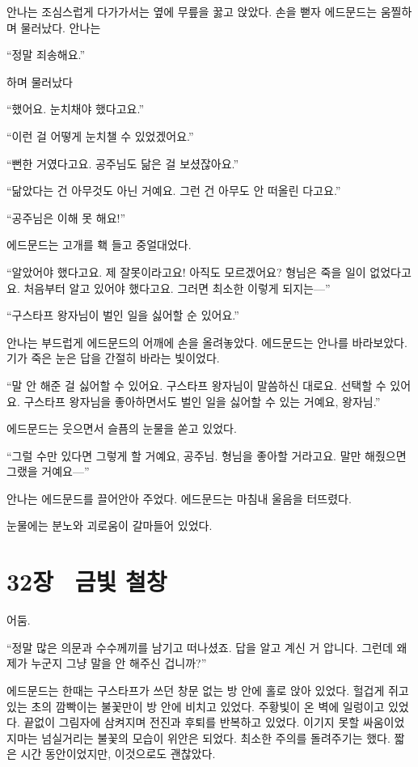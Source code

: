 안나는 조심스럽게 다가가서는 옆에 무릎을 꿇고 앉았다. 손을 뻗자 에드문드는 움찔하며 물러났다. 안나는

``정말 죄송해요.''

하며 물러났다

`` 했어요. 눈치채야 했다고요.''

``이런 걸 어떻게 눈치챌 수 있었겠어요.''

``뻔한 거였다고요. 공주님도 닮은 걸 보셨잖아요.''

``닮았다는 건 아무것도 아닌 거예요. 그런 건 아무도 안 떠올린 다고요.''

``공주님은 이해 못 해요!''

에드문드는 고개를 홱 들고 중얼대었다.

``알았어야 했다고요. 제 잘못이라고요! 아직도 모르겠어요? 형님은 죽을 일이 없었다고요. 처음부터 알고 있어야 했다고요. 그러면 최소한 이렇게 되지는—''

``구스타프 왕자님이 벌인 일을 싫어할 순 있어요.''

안나는 부드럽게 에드문드의 어깨에 손을 올려놓았다. 에드문드는 안나를 바라보았다. 기가 죽은 눈은 답을 간절히 바라는 빛이었다.

``말 안 해준 걸 싫어할 수 있어요. 구스타프 왕자님이 말씀하신 대로요. 선택할 수 있어요. 구스타프 왕자님을 좋아하면서도 벌인 일을 싫어할 수 있는 거예요, 왕자님.''

에드문드는 웃으면서 슬픔의 눈물을 쏟고 있었다.

``그럴 수만 있다면 그렇게 할 거예요, 공주님. 형님을 좋아할 거라고요. 말만 해줬으면 그랬을 거예요—''

안나는 에드문드를 끌어안아 주었다. 에드문드는 마침내 울음을 터뜨렸다.

눈물에는 분노와 괴로움이 갈마들어 있었다.



\chapter[32장  금빛 철창][32장\hspace*{.5em}금빛 철창]{32장 \ 금빛 철창}



어둠.

``정말 많은 의문과 수수께끼를 남기고 떠나셨죠. 답을 알고 계신 거 압니다. 그런데 왜 제가 누군지 그냥 말을 안 해주신 겁니까?''

에드문드는 한때는 구스타프가 쓰던 창문 없는 방 안에 홀로 앉아 있었다. 헐겁게 쥐고 있는 초의 깜빡이는 불꽃만이 방 안에 비치고 있었다. 주황빛이 온 벽에 일렁이고 있었다. 끝없이 그림자에 삼켜지며 전진과 후퇴를 반복하고 있었다. 이기지 못할 싸움이었지마는 넘실거리는 불꽃의 모습이 위안은 되었다. 최소한 주의를 돌려주기는 했다. 짧은 시간 동안이었지만, 이것으로도 괜찮았다.


